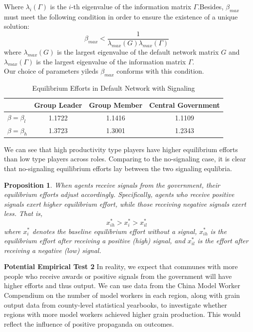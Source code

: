 \documentclass[12pt]{article}
\newtheorem{proposition}{Proposition}
\begin{document}
  Where $\lambda_i(\Gamma)$ is the $i$-th eigenvalue of the information matrix $\Gamma$.Besides, $\beta_{max}$ must meet the following condition in order to ensure the existence of a unique solution:
\[
\beta_{max} < \frac{1}{\lambda_{max}(G)\lambda_{max}(\Gamma)}
\] 
  where $\lambda_{max}(G)$ is the largest eigenvalue of the default network matrix $G$  and $\lambda_{max}(\Gamma)$ is the largest eigenvalue of the information matrix $\Gamma$.\\
Our choice of parameters yileds $\beta_{max}$ conforms with this condition. \\
\begin{table}[H]
  \centering
  \caption{Equilibrium Efforts in Default Network with Signaling}
  \begin{tabular}{lccc}
  \toprule
   & \textbf{Group Leader} & \textbf{Group Member} & \textbf{Central Government} \\
  \midrule
  \(\beta = \beta_l\) & 1.1722 & 1.1416 & 1.1109 \\
  \(\beta = \beta_h\) & 1.3723 & 1.3001 & 1.2343 \\
  \bottomrule
  \end{tabular}
  \end{table}
  We can see that high productivity type players have higher equilibrium efforts than low type players across roles. Comparing to the no-signaling case, it is clear that no-signaling equilibrium efforts lay between the two signaling equlibria. 
  \begin{proposition}
    When agents receive signals from the government, their equilibrium efforts adjust accordingly. Specifically, agents who receive positive signals exert higher equilibrium effort, while those receiving negative signals exert less. That is,
    \[
    x^*_{ih} > x^*_i > x^*_{il}
    \]
    where \( x^*_i \) denotes the baseline equilibrium effort without a signal, \( x^*_{ih} \) is the equilibrium effort after receiving a positive (high) signal, and \( x^*_{il} \) is the effort after receiving a negative (low) signal.
    \end{proposition}
\noindent \textbf{Potential Empirical Test 2} In reality, we expect that communes with more people who receive awards or positive signals from the government will have higher efforts and thus output. We can use data from the China Model Worker Compendium on the number of model workers in each region, along with grain output data from county-level statistical yearbooks, to investigate whether regions with more model workers achieved higher grain production. This would reflect the influence of positive propaganda on outcomes.\\
\end{document}
